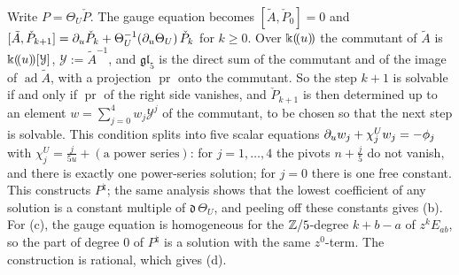 \begin{sketch}
Write $P=\Theta_U\check P$. The gauge equation becomes $[\tilde A,\check P_0]=0$ and $[\tilde A,\check P_{k+1}]=\partial_u\check P_k+\Theta_U^{-1}(\partial_u\Theta_U)\,\check P_k$ for $k\geq0$. Over $\Bbbk(\!(u)\!)$ the commutant of $\tilde A$ is $\Bbbk(\!(u)\!)[\mathcal Y]$, $\mathcal Y:=\tilde A^{-1}$, and $\mathfrak{gl}_5$ is the direct sum of the commutant and of the image of $\operatorname{ad}\tilde A$, with a projection $\operatorname{pr}$ onto the commutant. So the step $k+1$ is solvable if and only if $\operatorname{pr}$ of the right side vanishes, and $\check P_{k+1}$ is then determined up to an element $w=\sum_{j=0}^4w_j\mathcal Y^j$ of the commutant, to be chosen so that the next step is solvable. This condition splits into five scalar equations $\partial_uw_j+\chi^U_jw_j=-\phi_j$ with $\chi^U_j=\frac j{5u}+(\text{a power series})$: for $j=1,\dots,4$ the pivots $n+\frac j5$ do not vanish, and there is exactly one power-series solution; for $j=0$ there is one free constant. This constructs $P^\natural$; the same analysis shows that the lowest coefficient of any solution is a constant multiple of $\mathfrak d\,\Theta_U$, and peeling off these constants gives (b). For (c), the gauge equation is homogeneous for the $\mathbb{Z}/5$-degree $k+b-a$ of $z^kE_{ab}$, so the part of degree $0$ of $P^\natural$ is a solution with the same $z^0$-term. The construction is rational, which gives (d).
\end{sketch}


